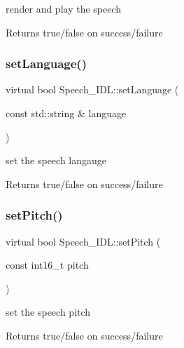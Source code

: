 render and play the speech 

\begin{DoxyReturn}{Returns}
true/false on success/failure 
\end{DoxyReturn}
\mbox{\label{classSpeech__IDL_abd517ac2ab8310d2eb0dcd756782ed85}} 
\subsubsection{\texorpdfstring{set\+Language()}{setLanguage()}}
{\footnotesize\ttfamily virtual bool Speech\+\_\+\+I\+D\+L\+::set\+Language (\begin{DoxyParamCaption}\item[{const std\+::string \&}]{language }\end{DoxyParamCaption})\hspace{0.3cm}{\ttfamily [virtual]}}



set the speech langauge 

\begin{DoxyReturn}{Returns}
true/false on success/failure 
\end{DoxyReturn}
\mbox{\label{classSpeech__IDL_a76a3da1b097f0e7b6cd79e77135ddf43}} 
\subsubsection{\texorpdfstring{set\+Pitch()}{setPitch()}}
{\footnotesize\ttfamily virtual bool Speech\+\_\+\+I\+D\+L\+::set\+Pitch (\begin{DoxyParamCaption}\item[{const int16\+\_\+t}]{pitch }\end{DoxyParamCaption})\hspace{0.3cm}{\ttfamily [virtual]}}



set the speech pitch 

\begin{DoxyReturn}{Returns}
true/false on success/failure 
\end{DoxyReturn}
\mbox{\label{classSpeech__IDL_ac4e0fe8f295cc10ed6cc2c3f5326db8e}} 
